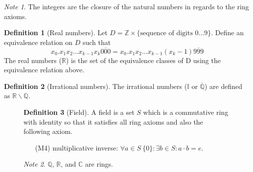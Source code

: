 \documentclass{article}
\newcommand*{\Z}{\mathbb{Z}}
\newcommand*{\Q}{\mathbb{Q}}
\newcommand*{\I}{\mathbb{I}}
\newcommand*{\R}{\mathbb{R}}
\newcommand*{\C}{\mathbb{C}}
\theoremstyle{plain}
\numberwithin{theorem}{subsection}
\theoremstyle{definition}
\newtheorem{definition}{Definition}[section]
\numberwithin{definition}{subsection}
\theoremstyle{remark}
\newtheorem{note}{Note}[section]
\numberwithin{note}{subsection}
\begin{document}
\begin{note}
    The integers are the closure of the natural numbers in regards to the ring axioms.
\end{note}
%
\begin{definition}[Real numbers]
    Let $D = \Z \times \{\text{sequence of digits $0\ldots 9$}\}$.
    Define an equivalence relation on $D$ such that
    \begin{equation*}
		x_0 . x_1 x_2 \dots x_{k-1} x_k \overline{000} = x_0 . x_1 x_2 \dots x_{k-1} \left(x_k - 1\right)\overline{999}
	\end{equation*}
    The real numbers ($\R$) is the set of the equivalence classes of D using the equivalence relation above.
\end{definition}
%
\begin{definition}[Irrational numbers]
    The irrational numbers ($\I$ or $\overline{\Q}$) are defined as $\R\backslash\Q$.
\end{definition}
%
\begin{figure}[H]
\begin{mdframed}[style=exampledefault,frametitle={Field Axioms}]
	\begin{definition}[Field]
	A field is a set $S$ which is a commutative ring with identity so that it satisfies all ring axioms and also the following axiom.
	\end{definition}
	\begin{enumerate}
		\item[(M4)] multiplicative inverse: $\forall a \in S \ \{0\}:\exists b \in S: a\cdot b=e$.
	\end{enumerate}
\end{mdframed}
\begin{note}
	$\Q$, $\R$, and $\C$ are rings.
\end{note}
\end{figure}
%
\end{document}

